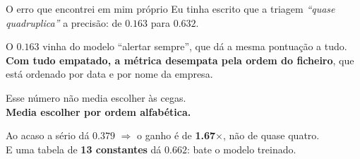 \documentclass[aspectratio=169]{beamer}
\begin{document}
\begin{frame}{O erro que encontrei em mim próprio}
Eu tinha escrito que a triagem \emph{``quase quadruplica''} a precisão: de $0.163$ para $0.632$.
\vspace{3mm}

O $0.163$ vinha do modelo ``alertar sempre'', que dá a mesma pontuação a tudo.\\
\textbf{Com tudo empatado, a métrica desempata pela ordem do ficheiro}, que está ordenado por data
e por nome da empresa.
\vspace{3mm}
\begin{center}
\large Esse número não media escolher às cegas.\\
\textbf{Media escolher por ordem alfabética.}
\end{center}
\vspace{3mm}
\footnotesize
Ao acaso a sério dá $0.379$ $\Rightarrow$ o ganho é de \textbf{1.67$\times$}, não de quase quatro.\\
E uma tabela de \textbf{13 constantes} dá $0.662$: bate o modelo treinado.
\end{frame}
\end{document}
